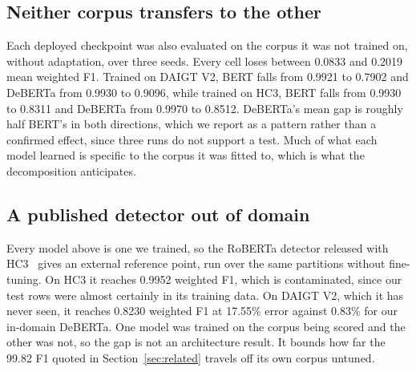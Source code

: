 \subsection{Neither corpus transfers to the other}
\label{sec:cross}

Each deployed checkpoint was also evaluated on the corpus it was not trained on, without adaptation, over three seeds. Every cell loses between 0.0833 and 0.2019 mean weighted F1. Trained on DAIGT V2, BERT falls from 0.9921 to 0.7902 and DeBERTa from 0.9930 to 0.9096, while trained on HC3, BERT falls from 0.9930 to 0.8311 and DeBERTa from 0.9970 to 0.8512. DeBERTa's mean gap is roughly half BERT's in both directions, which we report as a pattern rather than a confirmed effect, since three runs do not support a test. Much of what each model learned is specific to the corpus it was fitted to, which is what the decomposition anticipates.

\subsection{A published detector out of domain}
\label{sec:published}

Every model above is one we trained, so the RoBERTa detector released with HC3~\cite{HelloSimpleAI2023detector} gives an external reference point, run over the same partitions without fine-tuning. On HC3 it reaches 0.9952 weighted F1, which is contaminated, since our test rows were almost certainly in its training data. On DAIGT V2, which it has never seen, it reaches 0.8230 weighted F1 at 17.55\% error against 0.83\% for our in-domain DeBERTa. One model was trained on the corpus being scored and the other was not, so the gap is not an architecture result. It bounds how far the 99.82 F1 quoted in Section~\ref{sec:related} travels off its own corpus untuned.
